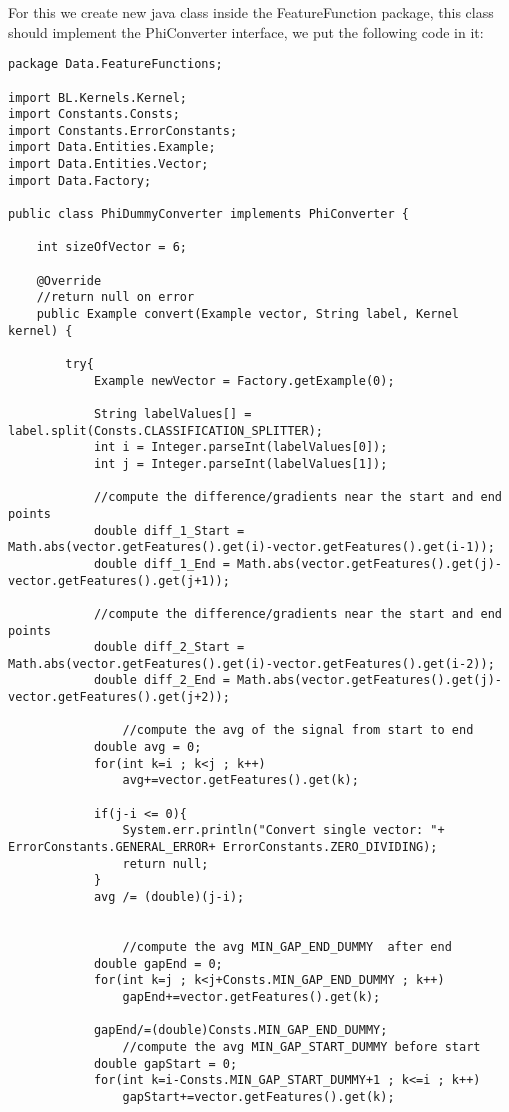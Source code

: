 \documentclass[11pt, oneside]{article}   	%
\begin{document}
For this we create new java class inside the FeatureFunction package, this class should implement the PhiConverter interface, we put the following code in it:
\begin{lstlisting}
package Data.FeatureFunctions;

import BL.Kernels.Kernel;
import Constants.Consts;
import Constants.ErrorConstants;
import Data.Entities.Example;
import Data.Entities.Vector;
import Data.Factory;

public class PhiDummyConverter implements PhiConverter {

    int sizeOfVector = 6;

	@Override
	//return null on error
	public Example convert(Example vector, String label, Kernel kernel) {

        try{
            Example newVector = Factory.getExample(0);

            String labelValues[] = label.split(Consts.CLASSIFICATION_SPLITTER);
            int i = Integer.parseInt(labelValues[0]);
            int j = Integer.parseInt(labelValues[1]);

            //compute the difference/gradients near the start and end points
            double diff_1_Start = Math.abs(vector.getFeatures().get(i)-vector.getFeatures().get(i-1));
            double diff_1_End = Math.abs(vector.getFeatures().get(j)-vector.getFeatures().get(j+1));

            //compute the difference/gradients near the start and end points
            double diff_2_Start = Math.abs(vector.getFeatures().get(i)-vector.getFeatures().get(i-2));
            double diff_2_End = Math.abs(vector.getFeatures().get(j)-vector.getFeatures().get(j+2));

	    		//compute the avg of the signal from start to end
            double avg = 0;
            for(int k=i ; k<j ; k++)
                avg+=vector.getFeatures().get(k);

            if(j-i <= 0){
                System.err.println("Convert single vector: "+ ErrorConstants.GENERAL_ERROR+ ErrorConstants.ZERO_DIVIDING);
                return null;
            }
            avg /= (double)(j-i);


				//compute the avg MIN_GAP_END_DUMMY  after end
            double gapEnd = 0;
            for(int k=j ; k<j+Consts.MIN_GAP_END_DUMMY ; k++)
                gapEnd+=vector.getFeatures().get(k);

            gapEnd/=(double)Consts.MIN_GAP_END_DUMMY;
				//compute the avg MIN_GAP_START_DUMMY before start
            double gapStart = 0;
            for(int k=i-Consts.MIN_GAP_START_DUMMY+1 ; k<=i ; k++)
                gapStart+=vector.getFeatures().get(k);


\end{lstlisting}
\end{document}
